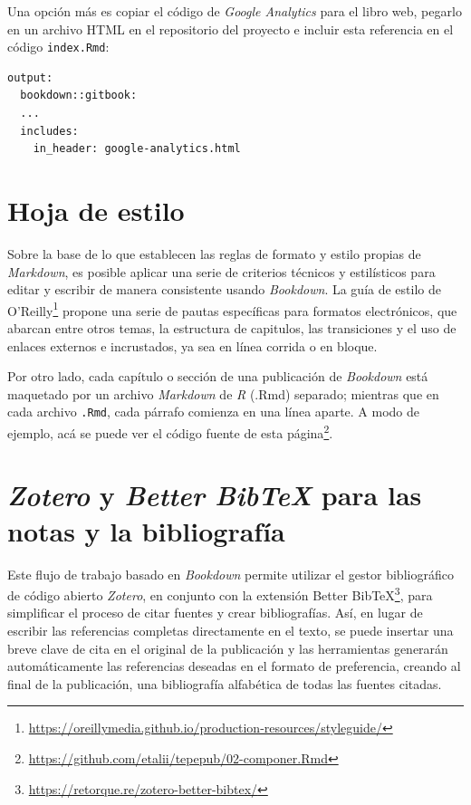 \documentclass[
]{krantz}
\DeclareRobustCommand{\href}[2]{#2\footnote{\url{#1}}}
\begin{document}
Una opción más es copiar el código de \emph{Google Analytics} para el libro web, pegarlo en un archivo HTML en el repositorio del proyecto e incluir esta referencia en el código \texttt{index.Rmd}:

\begin{verbatim}
output:
  bookdown::gitbook:
  ...
  includes:
    in_header: google-analytics.html
\end{verbatim}

\hypertarget{hoja-de-estilo}{%
\section{Hoja de estilo}\label{hoja-de-estilo}}

Sobre la base de lo que establecen las reglas de formato y estilo propias de \emph{Markdown}, es posible aplicar una serie de criterios técnicos y estilísticos para editar y escribir de manera consistente usando \emph{Bookdown}. La guía de estilo de \href{https://oreillymedia.github.io/production-resources/styleguide/}{O'Reilly} propone una serie de pautas específicas para formatos electrónicos, que abarcan entre otros temas, la estructura de capitulos, las transiciones y el uso de enlaces externos e incrustados, ya sea en línea corrida o en bloque.

Por otro lado, cada capítulo o sección de una publicación de \emph{Bookdown} está maquetado por un archivo \emph{Markdown} de \emph{R} (.Rmd) separado; mientras que en cada archivo \texttt{.Rmd}, cada párrafo comienza en una línea aparte. A modo de ejemplo, acá se puede ver el \href{https://github.com/etalii/tepepub/02-componer.Rmd}{código fuente de esta página}.

\hypertarget{zotero-y-better-bibtex-para-las-notas-y-la-bibliografuxeda}{%
\section{\texorpdfstring{\emph{Zotero} y \emph{Better BibTeX} para las notas y la bibliografía}{Zotero y Better BibTeX para las notas y la bibliografía}}\label{zotero-y-better-bibtex-para-las-notas-y-la-bibliografuxeda}}

Este flujo de trabajo basado en \emph{Bookdown} permite utilizar el gestor bibliográfico de código abierto \emph{Zotero}, en conjunto con la extensión \href{https://retorque.re/zotero-better-bibtex/}{Better BibTeX}, para simplificar el proceso de citar fuentes y crear bibliografías. Así, en lugar de escribir las referencias completas directamente en el texto, se puede insertar una breve clave de cita en el original de la publicación y las herramientas generarán automáticamente las referencias deseadas en el formato de preferencia, creando al final de la publicación, una bibliografía alfabética de todas las fuentes citadas.
\end{document}
